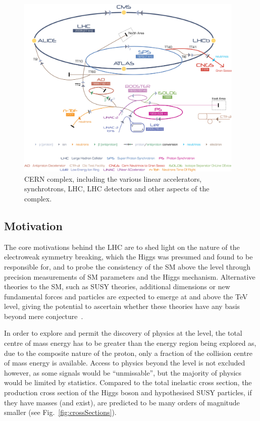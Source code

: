 \begin{figure}[htbp]
\begin{center}
\includegraphics[width=0.97\textwidth]{figs/lhc/Cern-Accelerator-Complex.jpg}
\caption{CERN complex, including the various linear accelerators, synchrotrons, LHC, LHC detectors and other aspects of the complex.}
\label{fig:cern-accelerator-complex}
\end{center}
\end{figure}

\subsection{Motivation}
The core motivations behind the LHC are to shed light on the nature of the electroweak symmetry breaking, which the Higgs was presumed and found to be responsible for, and to probe the consistency of the SM above the \TeV level through precision measurements of SM parameters and the Higgs mechanism.
Alternative theories to the SM, such as SUSY theories, additional dimensions or new fundamental forces and particles are expected to emerge at and above the TeV level, giving the potential to ascertain whether these theories have any basis beyond mere conjecture~\cite{Bayatian:2006zz}.

In order to explore and permit the discovery of physics at the \TeV level, the total centre of mass energy has to be greater than the energy region being explored as, due to the composite nature of the proton, only a fraction of the collision centre of mass energy is available.
Access to physics beyond the \TeV level is not excluded	however, as some signals would be ``unmissable'', but the majority of physics would be limited by statistics.
Compared to the total inelastic cross section, the production cross section of the Higgs boson and hypothesised SUSY particles, if they have \TeV masses (and exist), are predicted to be many orders of magnitude smaller (see Fig.~\ref{fig:crossSections}).

